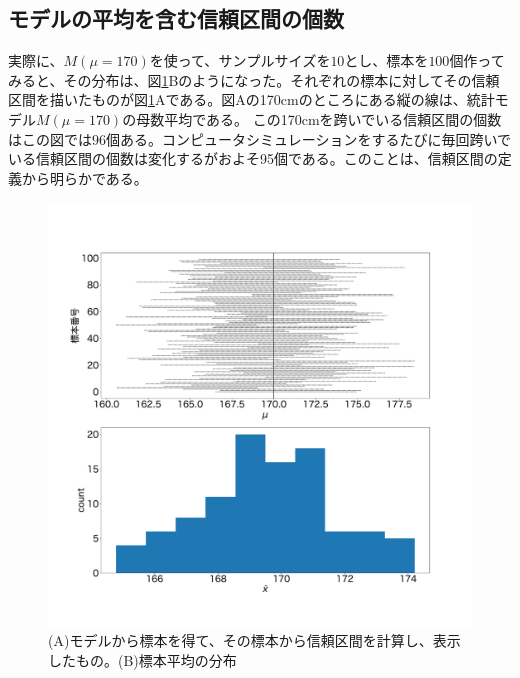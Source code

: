 \subsection{モデルの平均を含む信頼区間の個数}

実際に、$M(\mu=170)$を使って、$サンプルサイズを10$とし、標本を$100$個作ってみると、その分布は、図\ref{fig:confidence_interval_sample}Bのようになった。それぞれの標本に対してその信頼区間を描いたものが図\ref{fig:confidence_interval_sample}Aである。図Aの170cmのところにある縦の線は、統計モデル$M(\mu=170)$の母数平均である。
この170cmを跨いでいる信頼区間の個数はこの図では$96$個ある。コンピュータシミュレーションをするたびに毎回跨いでいる信頼区間の個数は変化するがおよそ95個である。このことは、信頼区間の定義から明らかである。


\begin{figure}
\begin{center}
    \includegraphics[width=15cm]{./image/03_/confidence_interval_model_count.pdf}
    \caption{(A)モデルから標本を得て、その標本から信頼区間を計算し、表示したもの。(B)標本平均の分布}
    \label{fig:confidence_interval_sample}
  \end{center}
\end{figure}


